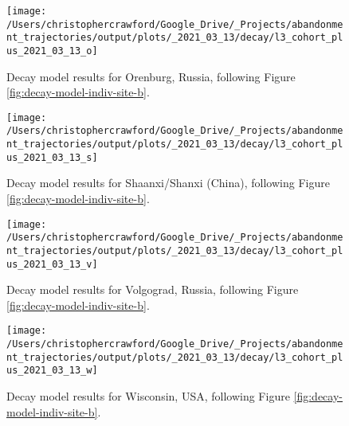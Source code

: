 \documentclass[9pt,twoside,lineno]{pnas-new}
\begin{document}
\begin{figure}
\texttt{[image: /Users/christophercrawford/Google\_Drive/\_Projects/abandonment\_trajectories/output/plots/\_2021\_03\_13/decay/l3\_cohort\_plus\_2021\_03\_13\_o]} \caption{Decay model results for Orenburg, Russia, following Figure \ref{fig:decay-model-indiv-site-b}.}\label{fig:decay-model-indiv-site-o}
\end{figure}

\begin{figure}
\texttt{[image: /Users/christophercrawford/Google\_Drive/\_Projects/abandonment\_trajectories/output/plots/\_2021\_03\_13/decay/l3\_cohort\_plus\_2021\_03\_13\_s]} \caption{Decay model results for Shaanxi/Shanxi (China), following Figure \ref{fig:decay-model-indiv-site-b}.}\label{fig:decay-model-indiv-site-s}
\end{figure}

\begin{figure}
\texttt{[image: /Users/christophercrawford/Google\_Drive/\_Projects/abandonment\_trajectories/output/plots/\_2021\_03\_13/decay/l3\_cohort\_plus\_2021\_03\_13\_v]} \caption{Decay model results for Volgograd, Russia, following Figure \ref{fig:decay-model-indiv-site-b}.}\label{fig:decay-model-indiv-site-v}
\end{figure}

\begin{figure}
\texttt{[image: /Users/christophercrawford/Google\_Drive/\_Projects/abandonment\_trajectories/output/plots/\_2021\_03\_13/decay/l3\_cohort\_plus\_2021\_03\_13\_w]} \caption{Decay model results for Wisconsin, USA, following Figure \ref{fig:decay-model-indiv-site-b}.}\label{fig:decay-model-indiv-site-w}
\end{figure}

\showmatmethods
\showacknow
\pnasbreak
\end{document}
